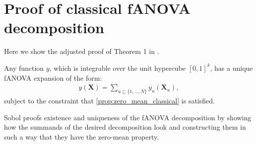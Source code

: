 \section*{Proof of classical fANOVA decomposition}
Here we show the adjusted proof of Theorem 1 in \cite{sobol1993sensitivity}.
\begin{theorem}
    Any function $y$, which is integrable over the unit hypercube $[0, 1]^k$, has a unique fANOVA expansion of the form:
    \begin{align*}
        y(\boldsymbol{X}) = \sum_{u \subseteq \{1, \dots, N\}} y_{u}(\boldsymbol{X}_u),
    \end{align*}
    subject to the constraint that \autoref{prop:zero_mean_classical} is satisfied.
\end{theorem}
Sobol proofs existence and uniqueness of the fANOVA decomposition by showing how the summands of the desired decomposition look and constructing them in such a way that they have the zero-mean property.

